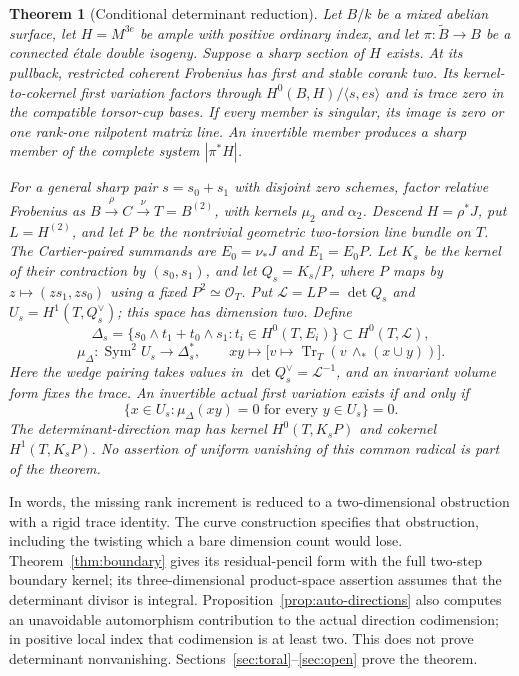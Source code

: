 \documentclass[11pt]{article}
\newtheorem{theorem}{Theorem}[section]
\theoremstyle{definition}\newtheorem{definition}[theorem]{Definition}
\theoremstyle{remark}\newtheorem{remark}[theorem]{Remark}
\newcommand{\OO}{\mathcal O}
\begin{document}
\begin{theorem}[Conditional determinant reduction]\label{thm:intro-reduction}
Let $B/k$ be a mixed abelian surface, let $H=M^{3e}$ be ample with positive ordinary index, and let $\pi:\widetilde B\to B$ be a connected \'etale double isogeny. Suppose a sharp section of $H$ exists. At its pullback, restricted coherent Frobenius has first and stable corank two. Its kernel-to-cokernel first variation factors through
$H^0(B,H)/\langle s,es\rangle$ and is trace zero in the compatible torsor-cup bases. If every member is singular, its image is zero or one rank-one nilpotent matrix line. An invertible member produces a sharp member of the complete system $|\pi^*H|$.

For a general sharp pair $s=s_0+s_1$ with disjoint zero schemes, factor relative Frobenius as $B\xrightarrow{\rho}C\xrightarrow{\nu}T=B^{(2)}$, with kernels $\mu_2$ and $\alpha_2$. Descend $H=\rho^*J$, put $L=H^{(2)}$, and let $P$ be the nontrivial geometric two-torsion line bundle on $T$. The Cartier-paired summands are $E_0=\nu_*J$ and $E_1=E_0P$. Let $K_s$ be the kernel of their contraction by $(s_0,s_1)$, and let $Q_s=K_s/P$, where $P$ maps by $z\mapsto(zs_1,zs_0)$ using a fixed $P^2\simeq\OO_T$. Put $\mathcal L=LP=\det Q_s$ and $U_s=H^1(T,Q_s^\vee)$; this space has dimension two. Define
\[
 \Delta_s=\{s_0\wedge t_1+t_0\wedge s_1:t_i\in H^0(T,E_i)\}
       \subset H^0(T,\mathcal L),
\]
\[
 \mu_{\Delta}:\operatorname{Sym}^2 U_s\longrightarrow\Delta_s^*,
 \qquad xy\longmapsto
       \bigl[v\mapsto\operatorname{Tr}_T(v\,\wedge_*(x\cup y))\bigr].
\]
Here the wedge pairing takes values in $\det Q_s^\vee=\mathcal L^{-1}$, and an invariant volume form fixes the trace. An invertible actual first variation exists if and only if
\[
 \{x\in U_s:\mu_{\Delta}(xy)=0\text{ for every }y\in U_s\}=0.
\]
The determinant-direction map has kernel $H^0(T,K_sP)$ and cokernel $H^1(T,K_sP)$. No assertion of uniform vanishing of this common radical is part of the theorem.
\end{theorem}

In words, the missing rank increment is reduced to a two-dimensional obstruction with a rigid trace identity. The curve construction specifies that obstruction, including the twisting which a bare dimension count would lose. Theorem~\ref{thm:boundary} gives its residual-pencil form with the full two-step boundary kernel; its three-dimensional product-space assertion assumes that the determinant divisor is integral. Proposition~\ref{prop:auto-directions} also computes an unavoidable automorphism contribution to the actual direction codimension; in positive local index that codimension is at least two. This does not prove determinant nonvanishing. Sections~\ref{sec:toral}--\ref{sec:open} prove the theorem.
\end{document}
